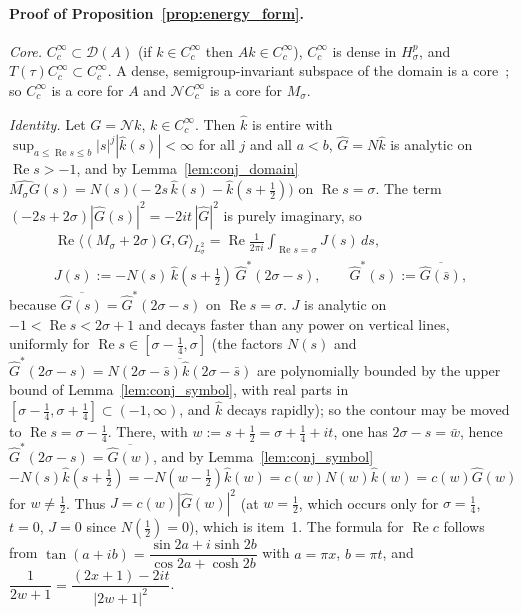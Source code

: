 \documentclass[11pt,a4paper]{article}
\begin{document}
\paragraph{Proof of Proposition~\ref{prop:energy_form}.}
\emph{Core.}  $C_c^\infty\subset\mathcal{D}(A)$ (if $k\in C_c^\infty$ then $Ak\in C_c^\infty$), $C_c^\infty$ is dense in $H^p_\sigma$, and
$T(\tau)C_c^\infty\subset C_c^\infty$.  A dense, semigroup-invariant subspace of the domain is a core~\cite[Prop.~II.1.7]{engelnagel2000};
so $C_c^\infty$ is a core for $A$ and $\mathcal{N}C_c^\infty$ is a core for $M_\sigma$.

\emph{Identity.}  Let $G=\mathcal{N}k$, $k\in C_c^\infty$.  Then $\widehat{k}$ is entire with
$\sup_{a\le\operatorname{Re}s\le b}|s|^j|\widehat{k}(s)|<\infty$ for all $j$ and all $a<b$, $\widehat{G}=N\widehat{k}$ is analytic on
$\operatorname{Re}s>-1$, and by Lemma~\ref{lem:conj_domain}
$\widehat{M_\sigma G}(s)=N(s)\bigl(-2s\,\widehat{k}(s)-\widehat{k}(s+\tfrac12)\bigr)$ on $\operatorname{Re}s=\sigma$.  The term
$(-2s+2\sigma)|\widehat{G}(s)|^2=-2it\,|\widehat{G}|^2$ is purely imaginary, so
\begin{gather*}
\operatorname{Re}\langle(M_\sigma+2\sigma)G,G\rangle_{L^2_\sigma}
=\operatorname{Re}\frac{1}{2\pi i}\int_{\operatorname{Re}s=\sigma}J(s)\,ds,\\
J(s):=-N(s)\,\widehat{k}(s+\tfrac12)\,\widehat{G}^*(2\sigma-s),\qquad \widehat{G}^*(s):=\overline{\widehat{G}(\bar s)},
\end{gather*}
because $\overline{\widehat{G}(s)}=\widehat{G}^*(2\sigma-s)$ on $\operatorname{Re}s=\sigma$.  $J$ is analytic on $-1<\operatorname{Re}s<2\sigma+1$ and
decays faster than any power on vertical lines, uniformly for $\operatorname{Re}s\in[\sigma-\tfrac14,\sigma]$ (the factors $N(s)$ and
$\widehat{G}^*(2\sigma-s)=\overline{N(2\sigma-\bar s)\widehat{k}(2\sigma-\bar s)}$ are polynomially bounded by the upper bound of
Lemma~\ref{lem:conj_symbol}, with real parts in $[\sigma-\tfrac14,\sigma+\tfrac14]\subset(-1,\infty)$, and $\widehat{k}$ decays rapidly); so the contour may be moved to
$\operatorname{Re}s=\sigma-\tfrac14$.  There, with $w:=s+\tfrac12=\sigma+\tfrac14+it$, one has $2\sigma-s=\bar w$, hence
$\widehat{G}^*(2\sigma-s)=\overline{\widehat{G}(w)}$, and by Lemma~\ref{lem:conj_symbol}
$-N(s)\widehat{k}(s+\tfrac12)=-N(w-\tfrac12)\widehat{k}(w)=c(w)N(w)\widehat{k}(w)=c(w)\widehat{G}(w)$ for $w\ne\tfrac12$.
Thus $J=c(w)|\widehat{G}(w)|^2$ (at $w=\tfrac12$, which occurs only for $\sigma=\tfrac14$, $t=0$, $J=0$ since $N(\tfrac12)=0$), which is item~1.
The formula for $\operatorname{Re}c$ follows from $\tan(a+ib)=\dfrac{\sin 2a+i\sinh 2b}{\cos 2a+\cosh 2b}$ with $a=\pi x$, $b=\pi t$, and
$\dfrac{1}{2w+1}=\dfrac{(2x+1)-2it}{|2w+1|^2}$.
\end{document}
